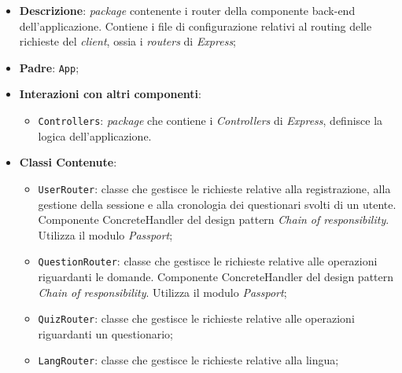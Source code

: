 	\begin{itemize}
		\item \textbf{Descrizione}: 
		\textit{package} contenente i router della componente back-end dell'applicazione. Contiene i file di configurazione relativi al routing delle richieste del \textit{client}, ossia i \textit{routers} di \textit{Express};
		\item \textbf{Padre}: \texttt{App};
		\item \textbf{Interazioni con altri componenti}:
			\begin{itemize}
				\item \texttt{Controllers}: \textit{package} che contiene i \textit{Controllers} di \textit{Express}, definisce la logica dell'applicazione.
			\end{itemize}
		\item \textbf{Classi Contenute}:
		\begin{itemize}
			\item \texttt{UserRouter}: classe che gestisce le richieste relative alla registrazione, alla gestione della sessione e alla cronologia dei questionari svolti di un utente. Componente ConcreteHandler del design pattern \textit{Chain of responsibility}. Utilizza il modulo \textit{Passport};
			\item \texttt{QuestionRouter}: classe che gestisce le richieste relative alle operazioni riguardanti le domande. Componente ConcreteHandler del design pattern \textit{Chain of responsibility}. Utilizza il modulo \textit{Passport};
			\item \texttt{QuizRouter}: classe che gestisce le richieste relative alle operazioni riguardanti un questionario;
			\item \texttt{LangRouter}: classe che gestisce le richieste relative alla lingua;
		\end{itemize}
	\end{itemize}
